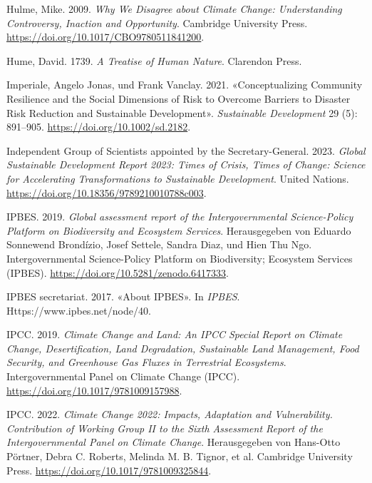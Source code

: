 \documentclass[
  nswissgerman,
  a4paper,
  DIV=11,
  numbers=noendperiod,
  oneside,
  openany]{scrreprt}
\newlength{\cslhangindent}
\newenvironment{CSLReferences}[2] %
 {\begin{list}{}{%
  \setlength{\itemindent}{0pt}
  \setlength{\leftmargin}{0pt}
  \setlength{\parsep}{0pt}
  \ifodd #1
   \setlength{\leftmargin}{\cslhangindent}
   \setlength{\itemindent}{-1\cslhangindent}
  \fi
  \setlength{\itemsep}{#2\baselineskip}}}
 {\end{list}}
\begin{document}
\begin{CSLReferences}{1}{1}
Hulme, Mike. 2009. \emph{Why {We Disagree} about {Climate Change}:
{Understanding Controversy}, {Inaction} and {Opportunity}}. Cambridge
University Press. \url{https://doi.org/10.1017/CBO9780511841200}.

Hume, David. 1739. \emph{A {Treatise} of {Human Nature}}. Clarendon
Press.

Imperiale, Angelo Jonas, und Frank Vanclay. 2021. {«Conceptualizing
Community Resilience and the Social Dimensions of Risk to Overcome
Barriers to Disaster Risk Reduction and Sustainable Development»}.
\emph{Sustainable Development} 29 (5): 891--905.
\url{https://doi.org/10.1002/sd.2182}.

Independent Group of Scientists appointed by the Secretary-General.
2023. \emph{Global {Sustainable Development Report} 2023: {Times} of
Crisis, Times of Change: {Science} for Accelerating Transformations to
Sustainable Development}. United Nations.
\url{https://doi.org/10.18356/9789210010788c003}.

IPBES. 2019. \emph{Global assessment report of the {Intergovernmental}
{Science}-{Policy} {Platform} on {Biodiversity} and {Ecosystem}
{Services}}. Herausgegeben von Eduardo Sonnewend Brondízio, Josef
Settele, Sandra Diaz, und Hien Thu Ngo. Intergovernmental Science-Policy
Platform on Biodiversity; Ecosystem Services (IPBES).
\url{https://doi.org/10.5281/zenodo.6417333}.

IPBES secretariat. 2017. {«About {IPBES}»}. In \emph{IPBES}.
Https://www.ipbes.net/node/40.

IPCC. 2019. \emph{Climate {Change} and {Land}: An {IPCC} Special Report
on Climate Change, Desertification, Land Degradation, Sustainable Land
Management, Food Security, and Greenhouse Gas Fluxes in Terrestrial
Ecosystems}. Intergovernmental Panel on Climate Change (IPCC).
\url{https://doi.org/10.1017/9781009157988}.

IPCC. 2022. \emph{Climate {Change} 2022: {Impacts}, Adaptation and
Vulnerability. {Contribution} of {Working Group II} to the {Sixth
Assessment Report} of the {Intergovernmental Panel} on {Climate
Change}}. Herausgegeben von Hans-Otto Pörtner, Debra C. Roberts, Melinda
M. B. Tignor, et al. Cambridge University Press.
\url{https://doi.org/10.1017/9781009325844}.


\end{CSLReferences}
\end{document}
